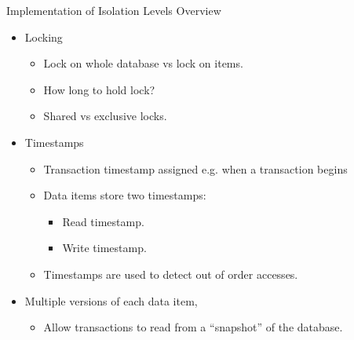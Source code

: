 \documentclass{beamer}
\begin{document}
\begin{frame}{Implementation of Isolation Levels}
    Overview
    \begin{itemize}
        \item Locking
            \begin{itemize}
                \item Lock on whole database vs lock on items.
                \item How long to hold lock?
                \item Shared vs exclusive locks.
            \end{itemize}
        \item Timestamps
            \begin{itemize}
                \item Transaction timestamp assigned e.g. when a transaction begins
                \item Data items store two timestamps:
                    \begin{itemize}
                        \item Read timestamp.
                        \item Write timestamp.
                    \end{itemize}
                \item Timestamps are used to detect out of order accesses.
            \end{itemize}
        \item Multiple versions of each data item,
            \begin{itemize}
             \item Allow transactions to read from a ``snapshot'' of the database.
            \end{itemize}
    \end{itemize}
\end{frame}
\end{document}
